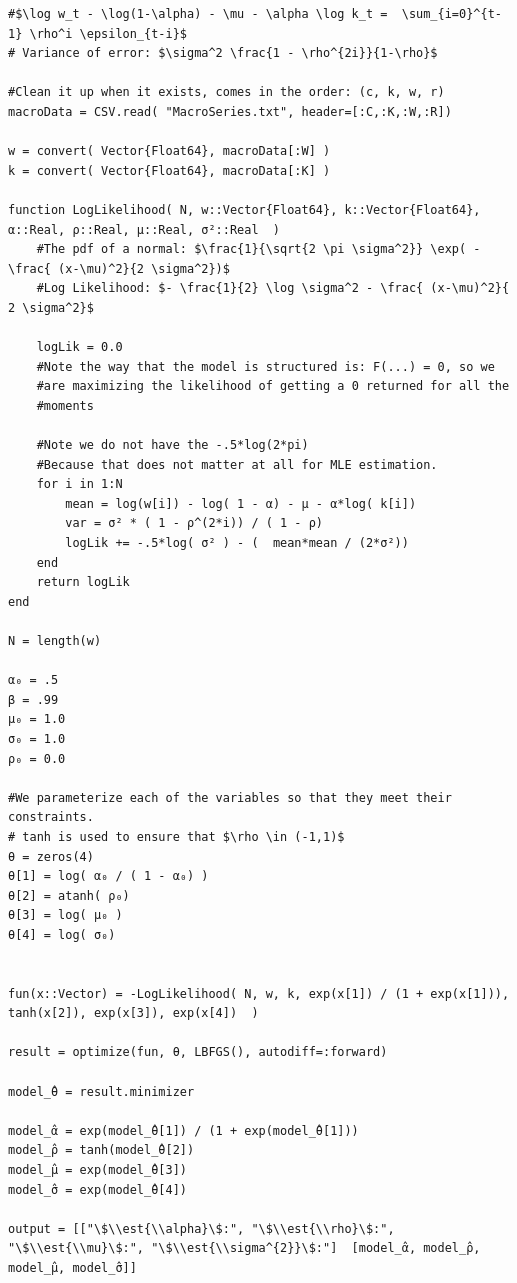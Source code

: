 \documentclass[12pt, letterpaper]{paper}
\begin{document}
\begin{verbatim}
#$\log w_t - \log(1-\alpha) - \mu - \alpha \log k_t =  \sum_{i=0}^{t-1} \rho^i \epsilon_{t-i}$
# Variance of error: $\sigma^2 \frac{1 - \rho^{2i}}{1-\rho}$

#Clean it up when it exists, comes in the order: (c, k, w, r)
macroData = CSV.read( "MacroSeries.txt", header=[:C,:K,:W,:R])

w = convert( Vector{Float64}, macroData[:W] )
k = convert( Vector{Float64}, macroData[:K] )

function LogLikelihood( N, w::Vector{Float64}, k::Vector{Float64}, α::Real, ρ::Real, μ::Real, σ²::Real  )
    #The pdf of a normal: $\frac{1}{\sqrt{2 \pi \sigma^2}} \exp( - \frac{ (x-\mu)^2}{2 \sigma^2})$
    #Log Likelihood: $- \frac{1}{2} \log \sigma^2 - \frac{ (x-\mu)^2}{ 2 \sigma^2}$

    logLik = 0.0
    #Note the way that the model is structured is: F(...) = 0, so we
    #are maximizing the likelihood of getting a 0 returned for all the
    #moments

    #Note we do not have the -.5*log(2*pi)
    #Because that does not matter at all for MLE estimation.
    for i in 1:N
        mean = log(w[i]) - log( 1 - α) - μ - α*log( k[i])
        var = σ² * ( 1 - ρ^(2*i)) / ( 1 - ρ)
        logLik += -.5*log( σ² ) - (  mean*mean / (2*σ²))
    end
    return logLik
end

N = length(w)

α₀ = .5
β = .99
μ₀ = 1.0
σ₀ = 1.0
ρ₀ = 0.0

#We parameterize each of the variables so that they meet their constraints.
# tanh is used to ensure that $\rho \in (-1,1)$
θ = zeros(4)
θ[1] = log( α₀ / ( 1 - α₀) )
θ[2] = atanh( ρ₀)
θ[3] = log( μ₀ )
θ[4] = log( σ₀)


fun(x::Vector) = -LogLikelihood( N, w, k, exp(x[1]) / (1 + exp(x[1])), tanh(x[2]), exp(x[3]), exp(x[4])  )

result = optimize(fun, θ, LBFGS(), autodiff=:forward)

model_̂θ = result.minimizer

model_̂α = exp(model_̂θ[1]) / (1 + exp(model_̂θ[1]))
model_̂ρ = tanh(model_̂θ[2])
model_̂μ = exp(model_̂θ[3])
model_̂σ = exp(model_̂θ[4])

output = [["\$\\est{\\alpha}\$:", "\$\\est{\\rho}\$:", "\$\\est{\\mu}\$:", "\$\\est{\\sigma^{2}}\$:"]  [model_̂α, model_̂ρ, model_̂μ, model_̂σ]]
\end{verbatim}
\end{document}
